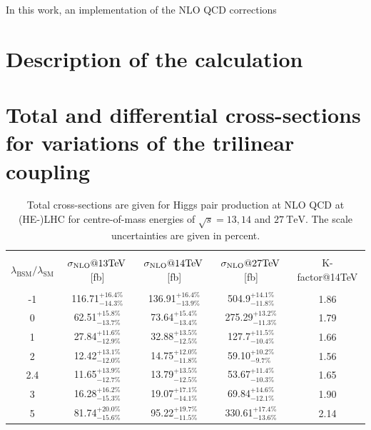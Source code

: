 \documentclass[a4paper]{jpconf}
\newcommand{\TeV}{\ensuremath{\mathrm{\:TeV}}}
\begin{document}
In this work, an implementation of the NLO QCD corrections 

\section{Description of the calculation}


\section{Total and differential cross-sections for variations of the trilinear coupling}

\begin{table}[htb!]
\begin{center}
\begin{tabular}{| c | c | c |c|c|}
\hline
&&&&\\
$\lambda_{\mathrm{BSM}}/\lambda_{\mathrm{SM}}$ & $\sigma_{\rm{NLO}}@13 \mathrm{TeV}$\,[fb]& $\sigma_{\rm{NLO}}@14 \mathrm{TeV}$\,[fb] & $\sigma_{\rm{NLO}}@27 \mathrm{TeV}$\,[fb] &K-factor@14TeV\\
&&&&\\
\hline
-1& 116.71$^{+16.4\%}_{-14.3\%}$  & 136.91$^{+16.4\%}_{-13.9\%}$& 504.9$^{+14.1\%}_{-11.8\%}$ & 1.86 \\
\hline
0& 62.51$^{+15.8\%}_{-13.7\%}$ & 73.64$^{+15.4\%}_{-13.4\%}$& 275.29$^{+13.2\%}_{-11.3\%}$& 1.79  \\
\hline 
1& 27.84$^{+11.6\%}_{-12.9\%}$ & 32.88$^{+13.5\%}_{-12.5\%}$&127.7$^{+11.5\%}_{-10.4\%}$ &1.66\\
\hline
2 & 12.42$^{+13.1\%}_{-12.0\%}$ & 14.75$^{+12.0\%}_{-11.8\%}$ &  59.10$^{+10.2\%}_{-9.7\%}$ & 1.56 \\
\hline
2.4& 11.65$^{+13.9\%}_{-12.7\%}$ & 13.79$^{+13.5\%}_{-12.5\%}$& 53.67$^{+11.4\%}_{-10.3\%}$ & 1.65 \\
\hline
3& 16.28$^{+16.2\%}_{-15.3\%}$ & 19.07$^{+17.1\%}_{-14.1\%}$ & 69.84$^{+14.6\%}_{-12.1\%}$ & 1.90 \\
\hline 
5& 81.74$^{+20.0\%}_{-15.6\%}$  & 95.22$^{+19.7\%}_{-11.5\%}$& 330.61$^{+17.4\%}_{-13.6\%}$ & 2.14 \\
\hline 
\end{tabular}
\end{center}
\caption{Total cross-sections are given for Higgs pair production at NLO QCD at (HE-)LHC for centre-of-mass energies of $\sqrt{s}=13,14$ and $27 \TeV$. The scale uncertainties are given in percent.
\label{tab:sigmatot}}
\end{table}
\end{document}
